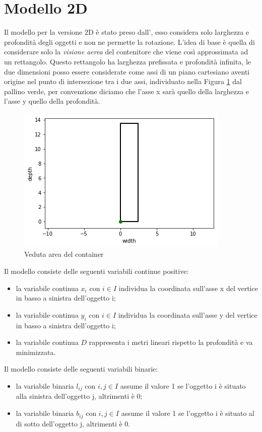 \section{Modello 2D}
Il modello per la versione 2D è stato preso dall', esso considera solo larghezza e profondità degli oggetti e non ne permette la rotazione. L'idea di base è quella di considerare solo la \textit{visione aerea} del contenitore che viene così approssimata ad un rettangolo. Questo rettangolo ha larghezza prefissata e profondità infinita, le due dimensioni posso essere considerate come assi di un piano cartesiano aventi origine nel punto di intersezione tra i due assi, individuato nella Figura \ref{fig:veduta_aerea} dal pallino verde, per convenzione diciamo che l'asse x sarà quello della larghezza e l'asse y quello della profondità.
\begin{figure}[H]
	\begin{center} \includegraphics[scale=0.6]{figures/cartesian_wd}
		\caption[Veduta area - piano cartesiano]{Veduta area del container}  
		\label{fig:veduta_aerea}
	\end{center}
\end{figure}

\noindent Il modello consiste delle seguenti variabili continue positive:
\begin{itemize}
	\item la variabile continua $x_{i}$ con $i \in I$ individua la coordinata sull'asse x del vertice in basso a sinistra dell'oggetto i;
	\item la variabile continua $y_{i}$ con $i \in I$ individua la coordinata sull'asse y del vertice in basso a sinistra dell'oggetto i;
	\item la variabile continua $D$ rappresenta i metri lineari rispetto la profondità e va minimizzata.
\end{itemize}
Il modello consiste delle seguenti variabili binarie:
\begin{itemize}
	\item la variabile binaria $l_{ij}$ con $i,j \in I$ assume il valore 1 se l'oggetto i è situato alla sinistra dell'oggetto j, altrimenti è 0;
	\item la variabile binaria $b_{ij}$ con $i,j \in I$ assume il valore 1 se l'oggetto i è situato al di sotto dell'oggetto j, altrimenti è 0.
\end{itemize}


